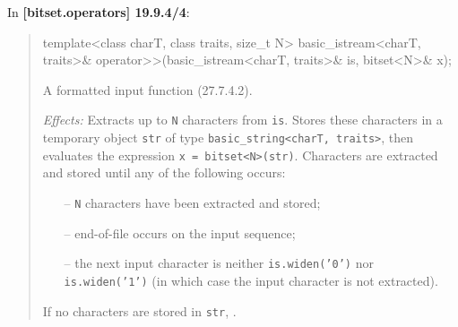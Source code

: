 \documentclass{wg21}
\begin{document}
In \textbf{[bitset.operators] 19.9.4/4}:
\begin{quote}
\begin{codeblock}
template<class charT, class traits, size_t N>
  basic_istream<charT, traits>&
    operator>>(basic_istream<charT, traits>& is, bitset<N>& x);
\end{codeblock}
A formatted input function (27.7.4.2).

\textit{Effects:} Extracts up to \texttt{N} characters from \texttt{is}. Stores
these characters in a temporary object \texttt{str} of type \texttt{basic_string<charT, traits>},
then evaluates the expression \texttt{x = bitset<N>(str)}. Characters are
extracted and stored until any of the following occurs:
\begin{itemize}
  \item[--] \texttt{N} characters have been extracted and stored;
  \item[--] end-of-file occurs on the input sequence;
  \item[--] the next input character is neither \texttt{is.widen(’0’)} nor
            \texttt{is.widen(’1’)} (in which case the input character is not extracted).
\end{itemize}
If no characters are stored in \texttt{str}, .
\end{quote}
\end{document}
